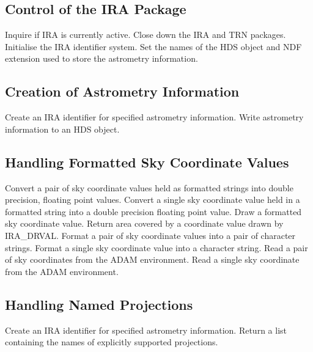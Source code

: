 \subsection {Control of the IRA Package}
   {Inquire if IRA is currently active.}
   {Close down the IRA and TRN packages.}
   {Initialise the IRA identifier system.}
   {Set the names of the HDS object and NDF extension used to store the
   astrometry information.}

\subsection {Creation of Astrometry Information}
   {Create an IRA identifier for specified astrometry information.}
   {Write astrometry information to an HDS object.}

\subsection {Handling Formatted Sky Coordinate Values}
   {Convert a pair of sky coordinate values held as formatted strings into
   double precision, floating point values.}
   {Convert a single sky coordinate value held in a formatted string into a
   double precision floating point value.}
   {Draw a formatted sky coordinate value.}
   {Return area covered by a coordinate value drawn by IRA\_DRVAL.}
   {Format a  pair of sky coordinate values into a pair of character strings.}
   {Format a  single sky coordinate value into a character string.}
   {Read a pair of sky coordinates from the ADAM environment.}
   {Read a single sky coordinate from the ADAM environment.}

\subsection {Handling Named Projections}
   {Create an IRA identifier for specified astrometry information.}
   {Return a list containing the names of explicitly supported projections.}

